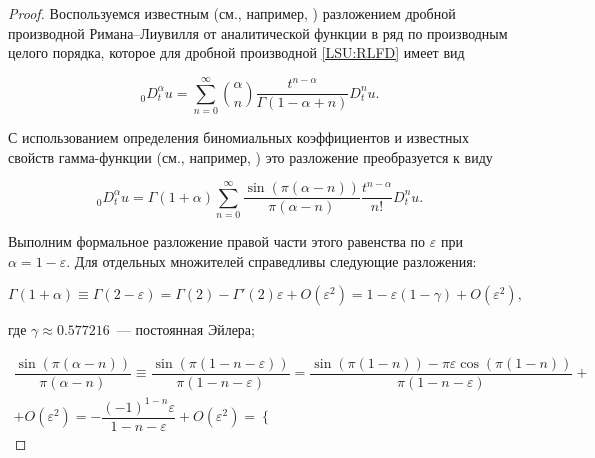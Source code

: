 \begin{proof}

Воспользуемся известным (см., например, \cite[формула (15.4)]{LSU:SKM}) разложением дробной производной Римана--Лиувилля от аналитической функции в ряд по производным целого порядка, которое для дробной производной \eqref{LSU:RLFD} имеет вид

$$

{}^{}_{0}D^{\alpha}_t u =\sum_{n=0}^\infty \binom{\alpha}{n} \dfrac{t^{n-\alpha}}{\Gamma(1-\alpha+n)} D^n_t u.

$$

С использованием определения биномиальных коэффициентов и известных свойств гамма-функции (см., например, \cite{LSU:AS}) это разложение преобразуется к виду

\begin{equation}

\label{LSU:Ser}

{}^{}_{0}D^{\alpha}_t u =\Gamma(1+\alpha)\sum_{n=0}^\infty \dfrac{\sin(\pi(\alpha-n))}{\pi(\alpha-n)}\dfrac{t^{n-\alpha}}{n!} D^n_t u.

\end{equation}



Выполним формальное разложение правой части этого равенства по $\varepsilon$ при $\alpha=1-\varepsilon$. Для отдельных множителей справедливы следующие разложения:

$$

\Gamma(1+\alpha) \equiv \Gamma(2- \varepsilon)= \Gamma(2) - \Gamma'(2) \varepsilon + O(\varepsilon^2) =

1 - \varepsilon (1-\gamma) + O(\varepsilon^2), 

$$

где $\gamma \approx 0.577216$~--- постоянная Эйлера;

\begin{multline*}

\dfrac{\sin(\pi(\alpha-n))}{\pi(\alpha-n)} \equiv \dfrac{\sin(\pi (1-n - \varepsilon))}{\pi (1-n - \varepsilon)}=

 \dfrac{\sin(\pi (1-n))  - \pi \varepsilon \cos(\pi (1-n))}{\pi (1-n - \varepsilon)}+  \\[2ex]

+ O(\varepsilon^2) 

= -\dfrac{(-1)^{1-n} \varepsilon }{1-n - \varepsilon}+O(\varepsilon^2)=

\left\{

\begin{array}{ll}


\end{array}
\end{multline*}
\end{proof}
